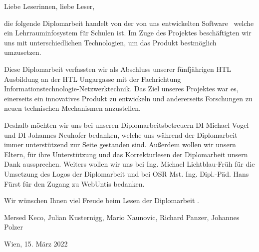 
Liebe Leserinnen, liebe Leser,

die folgende Diplomarbeit handelt von der von uns entwickelten Software \ZELIA\, welche ein Lehrrauminfosystem für Schulen ist. Im Zuge des Projektes beschäftigten wir uns mit unterschiedlichen Technologien, um das Produkt bestmöglich umzusetzen.

Diese Diplomarbeit verfassten wir als Abschluss unserer fünfjährigen HTL Ausbildung an der HTL Ungargasse mit der Fachrichtung Informations\-technologie-Netzwerk\-technik. Das Ziel unseres Projektes war es, einerseits ein innovatives Produkt zu entwickeln und andererseits Forschungen zu neuen technischen Mechanismen anzustellen.

Deshalb möchten wir uns bei unseren Diplomarbeitsbetreuern DI Michael Vogel und DI Johannes Neuhofer bedanken, welche uns während der Diplomarbeit immer unterstützend zur Seite gestanden sind. Außerdem wollen wir unsern Eltern, für ihre Unterstützung und das Korrekturlesen der Diplomarbeit unsern Dank aussprechen. Weiters wollen wir uns bei Ing. Michael Lichtblau-Früh für die Umsetzung des Logos der Diplomarbeit und bei OSR Mst. Ing. Dipl.-Päd. Hans Fürst für den Zugang zu WebUntis bedanken.

Wir wünschen Ihnen viel Freude beim Lesen der Diplomarbeit \ZELIA.

Mersed Keco, Julian Kusternigg, Mario Naunovic, Richard Panzer, Johannes Polzer

Wien, 15. März 2022
